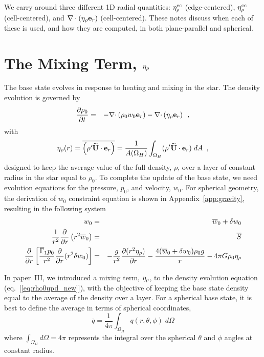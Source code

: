 We carry around three different 1D radial quantities: $\eta_{\rho}^{\rm ec}$
(edge-centered), $\eta_{\rho}^{\rm cc}$ (cell-centered), and $\nabla\cdot(\eta_{\rho}{\bf e}_r)$
(cell-centered).  These notes discuss when each of these is used, and
how they are computed, in both plane-parallel and spherical.

\section{The Mixing Term, $\eta_{\rho}$}

The base state evolves in response to heating and mixing in the star.
The density evolution is governed by
\begin{eqnarray}
\frac{\partial \rho_0}{\partial t} &=& - 
 \mathbf{\nabla} \mathbf{\cdot} \left( \rho_0 w_0 \mathbf{e}_r \right)
- \mathbf{\nabla} \mathbf{\cdot} \left( \eta_{\rho} \mathbf{e}_r \right) \enskip ,
\label{eq:rho0upd_new}
\end{eqnarray}
with
\begin{equation}
\eta_{\rho}(r) = \overline{\left({\rho^{\prime}} \widetilde{{\bf U}} \cdot \mathbf{e}_r \right)} = \frac{1}{A(\Omega_H)} 
 \int_{\Omega_H}  ({\rho^{\prime}} \widetilde{{\bf U}} \cdot \mathbf{e}_r ) \; dA \enskip , \label{eq:eta}
\end{equation}
designed to keep the average value of the full density, $\rho$, over a
layer of constant radius in the star equal to $\rho_0$.  To complete
the update of the base state, we need evolution equations for the
pressure, $p_0$, and velocity, $w_0$.  For spherical geometry, the
derivation of $w_0$ constraint equation is shown in
Appendix~\ref{app:gravity}, resulting in the following system
\begin{eqnarray}
w_0 &=& \overline{w}_0 + \delta w_0 \\
\frac{1}{r^2} \frac{\partial}{\partial r} \left (r^2 \overline{w}_0 \right ) &=& \overline{S} \\
\frac{\partial}{\partial r} \left[ \frac{\overline{\Gamma}_1 p_0}{r^2} \frac{\partial}{\partial r} (r^2 \delta w_0) \right] &=& - \frac{g}{r^2} \frac{\partial (r^2 \eta_{\rho})}{\partial r} - \frac{4 (\overline{w}_0 + \delta w_0) \rho_0 g}{r} 
- 4 \pi G \rho_0 \eta_{\rho} \label{eq:dw0constraint}
\end{eqnarray}

In paper~III, we introduced a mixing term, $\eta_{\rho}$, to the density
evolution equation (eq.~[\ref{eq:rho0upd_new}]), with the objective of
keeping the base state density equal to the average of the density
over a layer.  For a spherical base state, it is best to define the 
average in terms of spherical coordinates,
\begin{equation}
\overline{q} = \frac{1}{4\pi} \int_{\Omega_H} q(r,\theta,\phi) \; d\Omega
\end{equation}
where $\int_{\Omega_H} d\Omega = 4\pi$ represents the integral over
the spherical $\theta$ and $\phi$ angles at constant radius.

